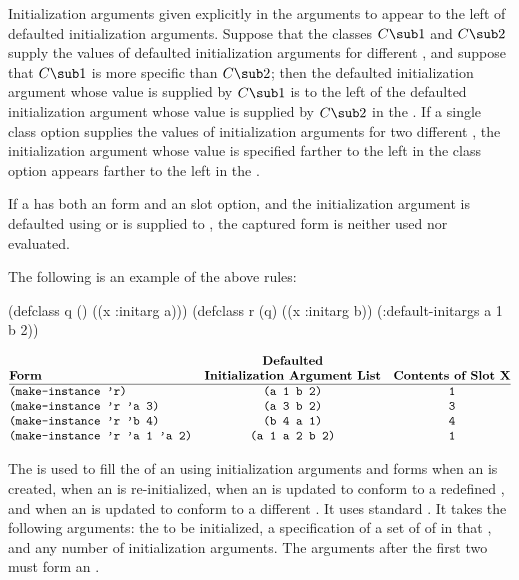 Initialization arguments given explicitly in the arguments to
 appear to the left of defaulted initialization
arguments. Suppose that the classes $C\sub 1$ and $C\sub 2$ supply the
values of defaulted initialization arguments for different ,
and suppose that $C\sub 1$ is more specific than $C\sub 2$; then the
defaulted initialization argument whose value is supplied by $C\sub 1$
is to the left of the defaulted initialization argument whose value is
supplied by $C\sub 2$ in the .  If a single  class option supplies the
values of initialization arguments for two different , the
initialization argument whose value is specified farther to the left in
the  class option appears farther to the left in
the .

                                                        
If a  has both an  form and an 
 slot option, and the initialization argument is defaulted
using  or is supplied to ,
the captured  form is neither used nor evaluated.

The following is an example of the above rules:

\code
 (defclass q () ((x :initarg a)))
 (defclass r (q) ((x :initarg b))
   (:default-initargs a 1 b 2))
\endcode

$$\vbox{\halign{\strut#\hfil&\quad\hfil#\hfil&\quad\hfil#\hfil\cr
{}&\bf Defaulted&{}\cr
\bf Form&\bf Initialization Argument List&\bf Contents of Slot X\cr
\noalign{\hrule}
{\tt (make-instance 'r)}&{\tt (a 1 b 2)}&{\tt 1}\cr
{\tt (make-instance 'r 'a 3)}&{\tt (a 3 b 2)}&{\tt 3}\cr
{\tt (make-instance 'r 'b 4)}&{\tt (b 4 a 1)}&{\tt 4}\cr
{\tt (make-instance 'r 'a 1 'a 2)}&{\tt (a 1 a 2 b 2)}&{\tt 1}\cr}}$$

\endsubsection%

                      
The   is used to fill the 
of an  
using initialization arguments and 
forms when an  is created, when an 
 is re-initialized,
when an  
is updated to conform to a redefined , and when
an  is updated to conform to a different .
It uses
standard . It takes the following arguments: the
 to be initialized, a 
specification of a set of  of 
 in that , and any number of initialization
arguments.  The arguments after the first two must form an
.
                        
